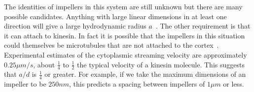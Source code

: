 \documentclass[11pt]{ucthesis}
\begin{document}


The identities of impellers in this system are still unknown but there are many possible
candidates. Anything with  large linear dimensions in at least one direction 
will give a large hydrodynamic radius $a$~\cite{BergRandomWalksinBiology}. The
other requirement is that it can attach to kinesin.  In fact
it is possible that the impellers in this situation could themselves be microtubules that are
not attached to the cortex~\cite{WangRiechmann,Seeger}.
Experimental estimates of the cytoplasmic streaming velocity
are approximately $0.25 \mu m/s$, about $\frac{1}{4}$ to $\frac{1}{2}$ the typical velocity of a kinesin
molecule. This suggests that $a/d$ is $\frac{1}{4}$ or greater.
For example, if we take the maximum dimensions of an impeller to be $250 nm$,
this predicts a spacing between impellers of $1 \mu m$ or less.
\end{document}
